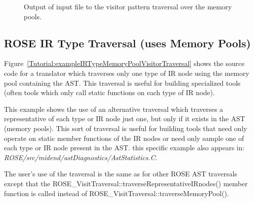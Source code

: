 \begin{figure}[!h]
{\indent
{\mySmallFontSize

\begin{latexonly}
   
\end{latexonly}

\begin{htmlonly}
   
\end{htmlonly}

}
}
\caption{Output of input file to the visitor pattern traversal over the memory pools.}
\label{Tutorial:exampleOutput_MemoryPoolVisitorPattern}
\end{figure}

\clearpage
\subsection{ROSE IR Type Traversal (uses Memory Pools)}

Figure~\ref{Tutorial:exampleIRTypeMemoryPoolVisitorTraversal} shows the source code 
for a translator which traverses only one type of IR node using the memory pool 
containing the AST.  This traversal is useful for building specialized tools
(often tools which only call static functions on each type of IR node).

This example shows the use of an alternative traversal which traverses a 
representative of each type or IR node just one, but only if it exists
in the AST (memory pools).  This sort of traversal is useful for building
tools that need only operate on static member functions of the IR nodes
or need only sample one of each type or IR node present in the AST.
this specific example also appears in:
     {\em ROSE/src/midend/astDiagnostics/AstStatistics.C}.

The user's use of the traversal is the same as for other ROSE AST traversals
except that the ROSE\_VisitTraversal::traverseRepresentativeIRnodes() member
function is called instead of ROSE\_VisitTraversal::traverseMemoryPool().

